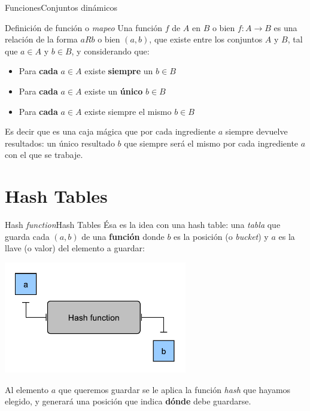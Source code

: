 \documentclass[spanish, c]{beamer}
\begin{document}
\begin{frame}{Funciones}{Conjuntos dinámicos}

    \begin{block}{Definición de función o \textit{mapeo}}
        Una \alert{función} $f$ de $A$ en $B$ o bien $f \colon A \to B$ es una relación de la forma $aRb$ o bien $(a,b)$, que existe entre los conjuntos $A$ y $B$, tal que $a \in A$ y $b \in B$, y considerando que:
        \begin{itemize}
            \item Para \textbf{cada} $a \in A$ existe \textbf{siempre} un $b \in B$
            \item Para \textbf{cada} $a \in A$ existe un \textbf{único} $b \in B$
            \item Para \textbf{cada} $a \in A$ existe siempre el mismo $b \in B$
        \end{itemize}
    \end{block} \pause

    \bigskip

    Es decir que es una caja mágica que por cada ingrediente $a$ siempre devuelve resultados: un único resultado $b$ que siempre será el mismo por cada ingrediente $a$ con el que se trabaje.
\end{frame}

\section{Hash Tables}

\begin{frame}{Hash \textit{function}}{Hash Tables}
    Ésa es la idea con una \alert{hash table}: una \textit{tabla} que guarda cada $(a,b)$ de una \textbf{función} donde $b$ es la \alert{posición} (o \textit{bucket}) y $a$ es la \alert{llave} (o valor) del elemento a guardar:

    \begin{center}
        \includegraphics[width=0.6\textwidth]{hash-fn.pdf}
    \end{center}

    Al elemento $a$ que queremos guardar se le aplica la función \textit{hash} que hayamos elegido, y generará una posición que indica \textbf{dónde} debe guardarse.
\end{frame}
\end{document}
